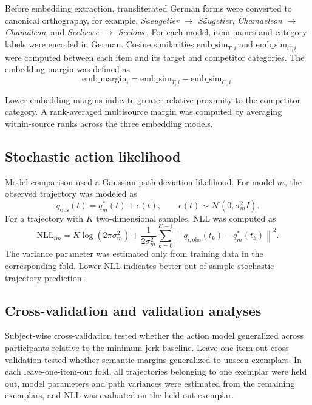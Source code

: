 \documentclass[11pt,final]{article}
\begin{document}
Before embedding extraction, transliterated German forms were converted to canonical orthography, for example, \textit{Saeugetier} $\rightarrow$ \textit{Säugetier}, \textit{Chamaeleon} $\rightarrow$ \textit{Chamäleon}, and \textit{Seeloewe} $\rightarrow$ \textit{Seelöwe}. For each model, item names and category labels were encoded in German. Cosine similarities $\mathrm{emb\_sim}_{T,i}$ and $\mathrm{emb\_sim}_{C,i}$ were computed between each item and its target and competitor categories. The embedding margin was defined as
\begin{equation}
\mathrm{emb\_margin}_i =
\mathrm{emb\_sim}_{T,i}
-
\mathrm{emb\_sim}_{C,i}.
\end{equation}

Lower embedding margins indicate greater relative proximity to the competitor category. A rank-averaged multisource margin was computed by averaging within-source ranks across the three embedding models.

\subsection{Stochastic action likelihood}

Model comparison used a Gaussian path-deviation likelihood. For model $m$, the observed trajectory was modeled as
\begin{equation}
q_{\mathrm{obs}}(t)=q^*_m(t)+\epsilon(t), \qquad
\epsilon(t)\sim\mathcal{N}(0,\sigma_m^2 I).
\end{equation}
For a trajectory with $K$ two-dimensional samples, NLL was computed as
\begin{equation}
\mathrm{NLL}_{im}
=
K\log(2\pi\sigma_m^2)
+
\frac{1}{2\sigma_m^2}
\sum_{k=0}^{K-1}
\left\|q_{i,\mathrm{obs}}(t_k)-q^*_{m}(t_k)\right\|^2 .
\end{equation}
The variance parameter was estimated only from training data in the corresponding fold. Lower NLL indicates better out-of-sample stochastic trajectory prediction.

\subsection{Cross-validation and validation analyses}

Subject-wise cross-validation tested whether the action model generalized across participants relative to the minimum-jerk baseline. Leave-one-item-out cross-validation tested whether semantic margins generalized to unseen exemplars. In each leave-one-item-out fold, all trajectories belonging to one exemplar were held out, model parameters and path variances were estimated from the remaining exemplars, and NLL was evaluated on the held-out exemplar.
\end{document}
